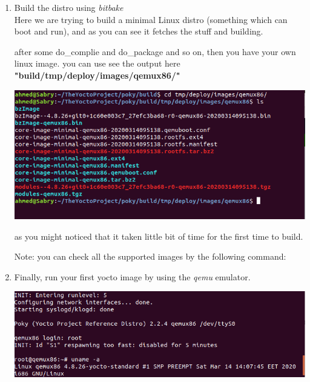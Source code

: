 \documentclass{article}
\begin{document}
\begin{enumerate}
\item Build the distro using \textit{bitbake}\\


Here we are trying to build a minimal Linux distro (something which can boot and run), and as you can see it fetches the stuff and building.


after some do\_complie and do\_package and so on, then you have your own linux image. you can use see the output here \textbf{"build/tmp/deploy/images/qemux86/"}

  \begin{center}
  \includegraphics[scale=0.60]{./resources/img/build-output.png}
  \end{center}

as you might noticed that it taken little bit of time for the first time to build. 

\begin{mybox}[title={Note: where to find all the supported images ?}]
  
  Note: you can check all the supported images by the following command:
  
  
\end{mybox}

  \item Finally, run your first yocto image by using the \textit{qemu} emulator.
    
  
    \begin{center}
  \includegraphics[scale=0.60]{./resources/img/minimal-runqemu.png}
  \end{center}
\end{enumerate}
\end{document}
